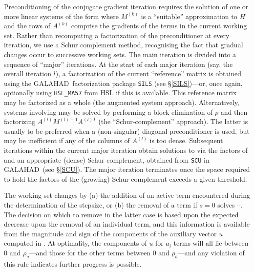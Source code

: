 \documentclass[twoside]{article}
\newcommand{\gal}{{\sf GALAHAD}}
\begin{document}
Preconditioning of the conjugate gradient iteration
requires the solution of one or more linear systems of the form
where $M^{(k)}$ is a ``suitable'' approximation to $H$
and the rows of $A^{(k)}$ comprise the gradients of the
terms in the current working set. Rather than recomputing a
factorization of the preconditioner at every iteration, we use a
Schur complement method, recognising the fact that
gradual changes occur to successive working sets. The main
iteration is divided into a sequence of ``major'' iterations.
At the start of each major iteration (say, the overall iteration $l$),
a factorization of the
current ``reference'' matrix
is obtained using  the \gal\ factorization package
{\tt SILS} (see \S\ref{SILS})---or, once again,
optionally using {\tt HSL\_MA57} from HSL if this is available.
This reference matrix may be factorized as a whole (the
augmented system approach). Alternatively, systems involving  may
be solved by performing a block elimination of $p$
and then factorizing $A^{(l)} M^{(l)-1} A^{(l)T}$
(the ``Schur-complement'' approach). The latter is usually to be preferred
when a (non-singular) diagonal
preconditioner is used, but may be inefficient if any of the columns
of $A^{(l)}$ is too dense.
Subsequent iterations within the current major
iteration obtain solutions to  via the factors of 
and an appropriate (dense) Schur complement,
obtained from {\tt SCU} in \gal\ (see \S\ref{SCU}).
The major iteration terminates
once the space required to hold the factors of the (growing) Schur
complement exceeds a given threshold.

The working set changes by (a)
the addition of an active term encountered during
the determination of the stepsize, or (b) the removal of a term if $s = 0$
solves --. The  decision on which to remove in the latter
case is based upon the expected decrease upon the removal of an individual term,
and this information is available from the magnitude and sign of the components
of the auxiliary vector $u$ computed in . At optimality, the
components of $u$ for $a_i$ terms will all lie between
$0$ and $\rho_g$---and those for the other terms
between $0$ and $\rho_b$---and any violation
of this rule indicates further progress is possible.
\end{document}
